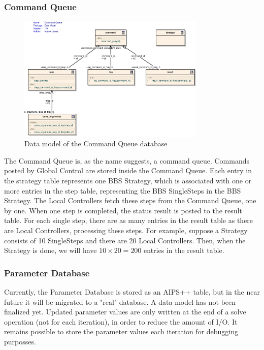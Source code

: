 \documentclass[10pt]{lofar}
\begin{document}
\subsubsection{Command Queue}
\label{subsubsec:design-command-queue}
\begin{figure}[!ht]
\includegraphics[width=0.8\textwidth]{images/command-queue-datamodel}
\caption{Data model of the Command Queue database}
\end{figure}
The Command Queue is, as the name suggests, a command queue. Commands posted
by Global Control are stored inside the Command Queue. Each entry in the
strategy table represents one BBS Strategy, which is associated with one or
more entries in the step table, representing the BBS SingleSteps in the BBS
Strategy. The Local Controllers fetch these steps from the Command Queue, one
by one. When one step is completed, the status result is posted to the result
table. For each single step, there are as many entries in the result table as
there are Local Controllers, processing these steps. For example, suppose a
Strategy consists of 10 SingleSteps and there are 20 Local Controllers. Then,
when the Strategy is done, we will have $10\times20=200$ entries in the result
table.

\subsubsection{Parameter Database}
\label{subsubsec:design-parameter-solutions}
Currently, the Parameter Database is stored as an AIPS++ table, but in the near
future it will be migrated to a "real" database. A data model has not been
finalized yet. Updated parameter values are only written at the end of a solve
operation (not for each iteration), in order to reduce the amount of I/O. It
remains possible to store the parameter values each iteration for debugging
purposses.
\end{document}
